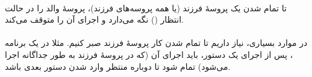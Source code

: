 \documentclass{article}
\begin{document}
	\paragraph*{}

	تا تمام شدن یک پروسهٔ فرزند (یا همه پروسه‌های فرزند)، پروسهٔ والد را در حالت انتظار
	()
	نگه می‌دارد و اجرای آن را متوقف می‌کند.

	\paragraph*{}
	در موارد بسیاری، نیاز داریم تا تمام شدن کار پروسهٔ فرزند صبر  کنیم. مثلا در یک برنامه
	،
	پس از اجرای یک دستور، باید اجرای آن (که در پروسهٔ فرزند به طور جداگانه اجرا می‌شود) تمام شود تا
	دوباره منتظر وارد شدن دستور بعدی باشد.
\end{document}
